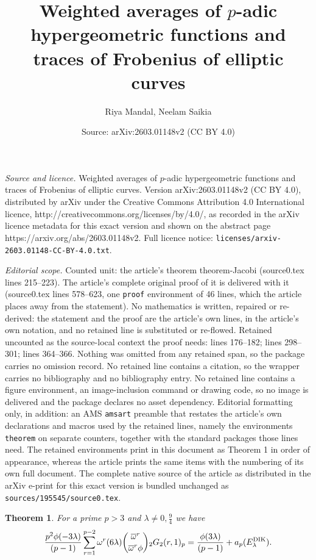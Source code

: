 \documentclass[10pt,a4paper]{amsart}
\title{Weighted averages of $p$-adic hypergeometric functions and traces of Frobenius of elliptic curves}
\author{Riya Mandal, Neelam Saikia}
\date{Source: arXiv:2603.01148v2 (CC BY 4.0)}
\newtheorem{theorem}{Theorem}
\newcommand{\dik}{\text{{\rm{DIK}}}}
\begin{document}
\maketitle

\noindent\emph{Source and licence.} Weighted averages of $p$-adic hypergeometric functions and traces of Frobenius of elliptic curves. Version arXiv:2603.01148v2 (CC BY 4.0), distributed by arXiv under the Creative Commons Attribution 4.0 International licence, http://creativecommons.org/licenses/by/4.0/, as recorded in the arXiv licence metadata for this exact version and shown on the abstract page https://arxiv.org/abs/2603.01148v2. Full licence notice: \texttt{licenses/arxiv-2603.01148-CC-BY-4.0.txt}.\par\smallskip

\noindent\textit{Editorial scope.} Counted unit: the article's theorem theorem-Jacobi (source0.tex lines 215--223). The article's complete original proof of it is delivered with it (source0.tex lines 578--623, one \texttt{proof} environment of 46 lines, which the article places away from the statement). No mathematics is written, repaired or re-derived: the statement and the proof are the article's own lines, in the article's own notation, and no retained line is substituted or re-flowed.  Retained uncounted as the source-local context the proof needs: lines 176--182; lines 298--301; lines 364--366.  Nothing was omitted from any retained span, so the package carries no omission record.  No retained line contains a citation, so the wrapper carries no bibliography and no bibliography entry.  No retained line contains a figure environment, an image-inclusion command or drawing code, so no image is delivered and the package declares no asset dependency.  Editorial formatting only, in addition: an AMS \texttt{amsart} preamble that restates the article's own declarations and macros used by the retained lines, namely the environments \texttt{theorem} on separate counters, together with the standard packages those lines need.  The retained environments print in this document as Theorem 1 in order of appearance, whereas the article prints the same items with the numbering of its own full document.  The complete native source of the article as distributed in the arXiv e-print for this exact version is bundled unchanged as \texttt{sources/195545/source0.tex}.
	\begin{theorem}\label{theorem-DIK-1}
For a prime $p>3$ and $\lambda\neq0,\frac{9}{4}$ we have 
	\begin{align}
\frac{p^2\phi(-3\lambda)}{(p-1)} \sum_{r=1}^{p-2}{\omega}^r(6\lambda)  \binom{\overline{\omega}^r}{\overline{\omega}^r\phi}
{_2G_2}(r,1)_p=\frac{\phi(3\lambda)}{(p-1)} + a_p(E_{\lambda}^{\dik}).\notag
   \end{align}
	\end{theorem}
\end{document}
